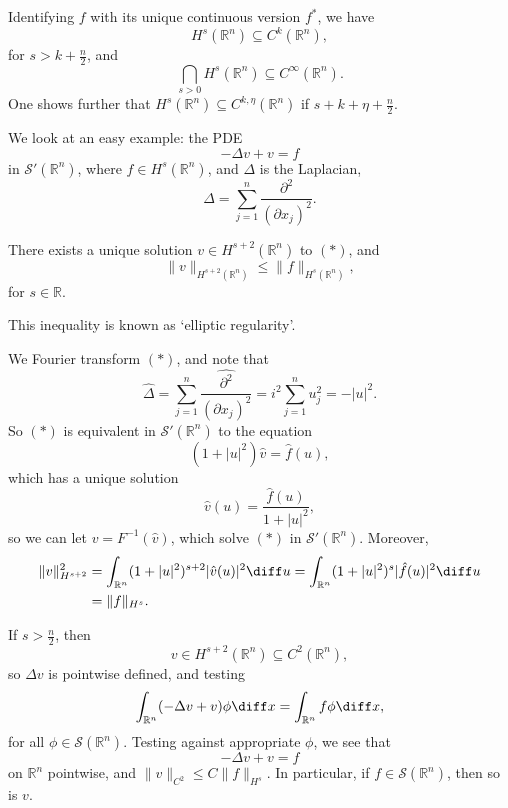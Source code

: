 \documentclass[12pt]{article}
\begin{document}
\begin{remark}
	Identifying $f$ with its unique continuous version $f^\ast$, we have
	\[
	H^s(\mathbb{R}^n) \subseteq C^k(\mathbb{R}^n),
	\]
	for $s > k + \frac{n}{2}$, and
	\[
	\bigcap_{s > 0} H^s(\mathbb{R}^n) \subseteq C^\infty (\mathbb{R}^n).
	\]
	One shows further that $H^s(\mathbb{R}^n) \subseteq C^{k, \eta}(\mathbb{R}^n)$ if $s + k + \eta + \frac{n}{2}$.
\end{remark}

We look at an easy example: the PDE
\[
	- \Delta v + v = f \tag{$\ast$}
\]
in $\mathcal{S}'(\mathbb{R}^n)$, where $f \in H^s(\mathbb{R}^n)$, and $\Delta$ is the Laplacian,
\[
\Delta = \sum_{j = 1}^n \frac{\partial^2}{(\partial x_j)^2}.
\]

\begin{theorem}
	There exists a unique solution $v \in H^{s+2}(\mathbb{R}^n)$ to $(\ast)$, and
	\[
	\|v\|_{H^{s+2}(\mathbb{R}^n)} \leq \|f\|_{H^s(\mathbb{R}^n)},
	\]
	for $s \in \mathbb{R}$.
\end{theorem}
This inequality is known as `elliptic regularity'.

\begin{proofbox}
	We Fourier transform $(\ast)$, and note that
	\[
		\hat \Delta = \sum_{j = 1}^n \widehat{\frac{\partial^2}{(\partial x_j)^2}} = i^2 \sum_{j = 1}^n u_j^2 = - |u|^2.
	\]
	So $(\ast)$ is equivalent in $\mathcal{S}'(\mathbb{R}^n)$ to the equation
	\[
		(1 + |u|^2) \hat v = \hat f(u),
	\]
	which has a unique solution
	\[
	\hat v(u) = \frac{\hat f(u)}{1 + |u|^2},
	\]
	so we can let $v = F^{-1}(\hat v)$, which solve $(\ast)$ in $\mathcal{S}'(\mathbb{R}^n)$. Moreover,
	\begin{align*}
		\|v\|^2_{H^{s+2}} &= \int_{\mathbb{R}^n} (1 + |u|^2)^{s + 2} |\hat v(u)|^2 \diff u = \int_{\mathbb{R}^n} (1 + |u|^2)^s |\hat f(u)|^2 \diff u \\
				  &= \|f\|_{H^s}.
	\end{align*}
\end{proofbox}

\begin{remark}
	If $s > \frac{n}{2}$, then
	\[
	v \in H^{s + 2}(\mathbb{R}^n) \subseteq C^2(\mathbb{R}^n),
	\]
	so $\Delta v$ is pointwise defined, and testing
	\[
	\int_{\mathbb{R}^n} ( - \Delta v + v) \phi \diff x = \int_{\mathbb{R}^n} f \phi \diff x,
	\]
	for all $\phi \in \mathcal{S}(\mathbb{R}^n)$. Testing against appropriate $\phi$, we see that
	\[
	- \Delta v + v = f
	\]
	on $\mathbb{R}^n$ pointwise, and $\|v\|_{C^2} \leq C \|f\|_{H^s}$. In particular, if $f \in \mathcal{S}(\mathbb{R}^n)$, then so is $v$.
\end{remark}
\end{document}
